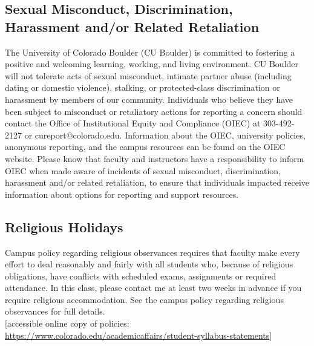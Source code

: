 \documentclass[9pt]{article}
\begin{document}
{\subsection*{Sexual Misconduct, Discrimination, Harassment and/or Related Retaliation}
The University of Colorado Boulder (CU Boulder) is committed to fostering a positive and welcoming learning, working, and living environment. CU Boulder will not tolerate acts of sexual misconduct, intimate partner abuse (including dating or domestic violence), stalking, or protected-class discrimination or harassment by members of our community. Individuals who believe they have been subject to misconduct or retaliatory actions for reporting a concern should contact the Office of Institutional Equity and Compliance (OIEC) at 303-492-2127 or cureport@colorado.edu. Information about the OIEC, university policies, anonymous reporting, and the campus resources can be found on the OIEC website. 
Please know that faculty and instructors have a responsibility to inform OIEC when made aware of incidents of sexual misconduct, discrimination, harassment and/or related retaliation, to ensure that individuals impacted receive information about options for reporting and support resources.
\subsection*{Religious Holidays}
Campus policy regarding religious observances requires that faculty make every effort to deal reasonably and fairly with all students who, because of religious obligations, have conflicts with scheduled exams, assignments or required attendance.  In this class, please contact me at least two weeks in advance if you require religious accommodation.  See the campus policy regarding religious observances for full details.
\\

[accessible online copy of policies: \url{https://www.colorado.edu/academicaffairs/student-syllabus-statements}]
}
\end{document}
